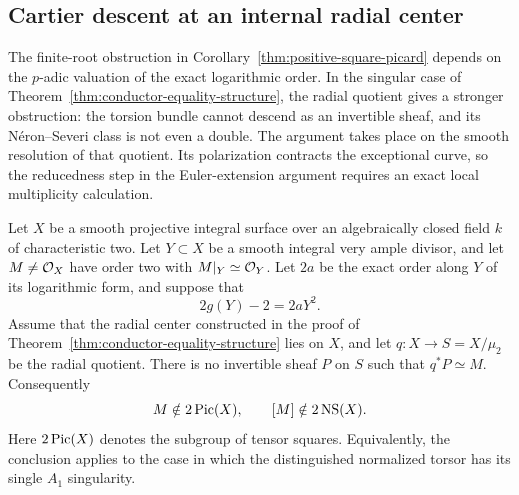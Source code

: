 \subsection{Cartier descent at an internal radial center}
\label{subsec:internal-cartier-descent}

The finite-root obstruction in
Corollary~\ref{thm:positive-square-picard} depends on the $p$-adic
valuation of the exact logarithmic order. In the singular case of
Theorem~\ref{thm:conductor-equality-structure}, the radial quotient
gives a stronger obstruction: the torsion bundle cannot descend as
an invertible sheaf, and its N\'eron--Severi class is not even a
double. The argument takes place on the smooth resolution of that
quotient. Its polarization contracts the exceptional curve, so the
reducedness step in the Euler-extension argument requires an exact
local multiplicity calculation.

\begin{proposition}\label{prop:internal-cartier-descent-obstruction}
Let $X$ be a smooth projective integral surface over an algebraically
closed field $k$ of characteristic two. Let $Y\subset X$ be a smooth
integral very ample divisor, and let $M\ne\mathcal O_X$ have order two with
$M|_Y\simeq\mathcal O_Y$. Let $2a$ be the exact order along $Y$ of its
logarithmic form, and suppose that
\[
 2g(Y)-2=2aY^2.
\]
Assume that the radial center constructed in the proof of
Theorem~\ref{thm:conductor-equality-structure} lies on $X$, and let
$q:X\to S=X/\mu_2$ be the radial quotient. There is no invertible
sheaf $P$ on $S$ such that $q^*P\simeq M$. Consequently
\[
 M\notin 2\operatorname{Pic}(X),\qquad
 [M]\notin 2\operatorname{NS}(X).
\]
Here $2\operatorname{Pic}(X)$ denotes the subgroup of tensor squares. Equivalently,
the conclusion applies to the case in which the distinguished
normalized torsor has its single $A_1$ singularity.
\end{proposition}

